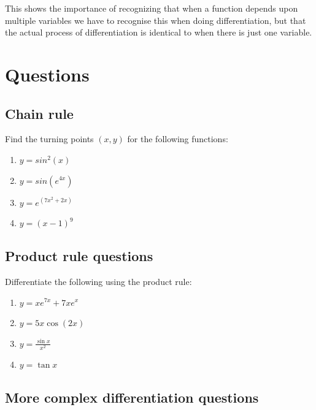 \documentclass[
]{book}
\providecommand{\tightlist}{%
  \setlength{\itemsep}{0pt}\setlength{\parskip}{0pt}}
\begin{document}
This shows the importance of recognizing that when a function depends upon multiple variables we have to recognise this when doing differentiation, but that the actual process of differentiation is identical to when there is just one variable.

\hypertarget{sec:Questions5}{%
\section{Questions}\label{sec:Questions5}}

\hypertarget{chain-rule}{%
\subsection{Chain rule}\label{chain-rule}}

Find the turning points \((x,y)\) for the following functions:

\begin{enumerate}
\def\labelenumi{\arabic{enumi}.}
\tightlist
\item
  \(y = sin^2(x)\)
\item
  \(y = sin(e^{4x})\)
\item
  \(y = e^{(7x^2 + 2x)}\)
\item
  \(y = (x-1)^9\)
\end{enumerate}

\hypertarget{product-rule-questions}{%
\subsection{Product rule questions}\label{product-rule-questions}}

Differentiate the following using the product rule:

\begin{enumerate}
\def\labelenumi{\arabic{enumi}.}
\tightlist
\item
  \(y = x e^{7x}+ 7xe^x\)
\item
  \(y = 5x \cos (2x)\)
\item
  \(y = \frac{\sin x}{x^2}\)
\item
  \(y = \tan x\)
\end{enumerate}

\hypertarget{more-complex-differentiation-questions}{%
\subsection{More complex differentiation questions}\label{more-complex-differentiation-questions}}
\end{document}
